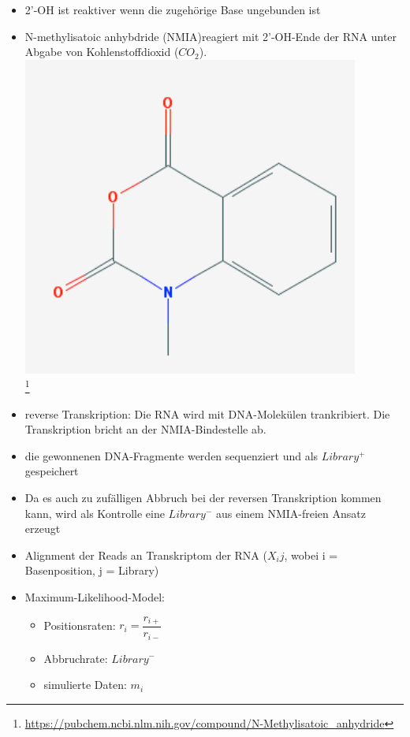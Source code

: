\begin{itemize}
\item 2'-OH ist reaktiver wenn die zugehörige Base ungebunden ist
\item N-methylisatoic anhybdride (NMIA)reagiert mit 2'-OH-Ende der RNA unter Abgabe von Kohlenstoffdioxid ($CO_2$). \\
\includegraphics[scale=0.5]{lectures/160527/pix/NMIA.jpg} \\
\footnote{\url{https://pubchem.ncbi.nlm.nih.gov/compound/N-Methylisatoic_anhydride}} \\

\item reverse Transkription: Die RNA wird mit DNA-Molekülen trankribiert. Die Transkription bricht an der NMIA-Bindestelle ab.
\item die gewonnenen DNA-Fragmente werden sequenziert und als $Library^+$ gespeichert
\item Da es auch zu zufälligen Abbruch bei der reversen Transkription kommen kann, wird als Kontrolle eine $Library^-$ aus einem NMIA-freien Ansatz erzeugt
\item Alignment der Reads an Transkriptom der RNA ($X_ij$, wobei i = Basenposition, j = Library)

\item Maximum-Likelihood-Model:

\begin{itemize}
\item Positionsraten: $r_i = \dfrac{r_{i+}}{r_{i-}}$
\item Abbruchrate: $Library^-$
\item simulierte Daten: $m_i$ 
\end{itemize}


\end{itemize}
